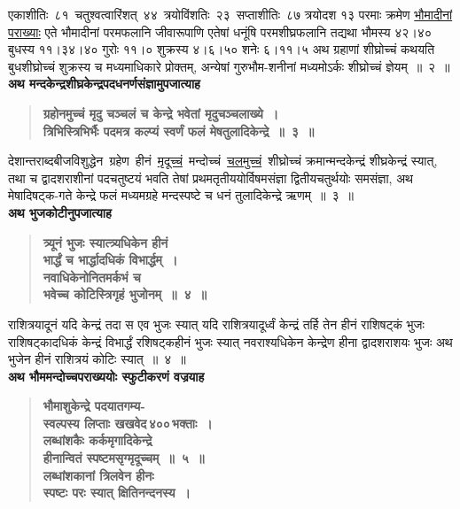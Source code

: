 \documentclass[11pt, openany]{book}
\begin{document}
एकाशीतिः \,८१ \,चतुश्वत्वारिंशत् \,४४ \,त्रयोविंशतिः \,२३ \,सप्ताशीतिः \,८७ त्रयोदश १३ परमाः क्रमेण \hyperref[2.2]{भौमादीनां पराख्याः} एते भौमादीनां परमफलानि जीवारूपाणि एतेषां धनूंषि परमशीघ्रफलानि तद्यथा भौमस्य ४२।४० बुधस्य ११।३४।४० गुरोः ११।० शुक्रस्य ४।६।५० शनेः ६।११।५ अथ ग्रहाणां शीघ्रोच्चं कथयति\textendash \,बुधशीघ्रोच्चं शुक्रस्य च मध्यमाधिकारे प्रोक्तम्, अन्येषां गुरुभौम-शनीनां मध्यमोऽर्कः शीघ्रोच्चं ज्ञेयम्~॥~२~॥\\

{\small \textbf{अथ मन्दकेन्द्रशीघ्रकेन्द्रपदधनर्णसंज्ञामुपजात्याह\textendash }}

 \label{2.3}
\begin{quote}
{\large \textbf{{\color{purple}ग्रहोनमुच्चं मृदु चञ्चलं च केन्द्रे भवेतां मृदुचञ्चलाख्ये~। \\
त्रिभिस्त्रिभिर्भैः पदमत्र कल्प्यं स्वर्णं फलं मेषतुलादिकेन्द्रे~॥~३~॥}}}
\end{quote}

\newpage

देशान्तराब्दबीजविशुद्धेन \,ग्रहेण \,हीनं \,\hyperref[2.3]{मृदूच्चं} \,मन्दोच्चं \,\hyperref[2.3]{चलमुच्चं} \,शीघ्रोच्चं क्रमान्मन्दकेन्द्रं शीघ्रकेन्द्रं स्यात्, तथा च द्वादशराशीनां पदचतुष्टयं भवति तेषां प्रथमतृतीययोर्विषमसंज्ञा द्वितीयचतुर्थयोः समसंज्ञा, अथ मेषादिषट्क-गते केन्द्रे फलं मध्यमग्रहे मन्दस्पष्टे च धनं तुलादिकेन्द्रे ऋणम्~॥~३~॥\\

{\small \textbf{अथ भुजकोटीनुपजात्याह\textendash }}

 \label{2.4}
\begin{quote}
{\large \textbf{{\color{purple}त्र्यूनं भुजः स्यात्त्र्यधिकेन हीनं \\
भार्द्धं च भार्द्धादधिकं विभार्द्धम्~। \\
नवाधिकेनोनितमर्कभं च \\
भवेच्च कोटिस्त्रिगृहं भुजोनम्~॥~४~॥}}}
\end{quote}

राशित्रयादूनं यदि केन्द्रं तदा स एव भुजः स्यात् यदि राशित्रयादूर्ध्वं केन्द्रं तर्हि तेन हीनं राशिषट्कं भुजः राशिषट्कादधिकं केन्द्रं विभार्द्धं रशिषट्कहीनं भुजः स्यात् नवराश्यधिकेन केन्द्रेण हीना द्वादशराशयः भुजः अथ भुजेन हीनं राशित्रयं कोटिः स्यात्~॥~४~॥\\

{\small \textbf{अथ भौममन्दोच्चपराख्ययोः स्फुटीकरणं वज्रयाह\textendash }}

 \label{2.5}
\begin{quote}
{\large \textbf{{\color{purple}भौमाशुकेन्द्रे पदयातगम्य-\\
स्वल्पस्य लिप्ताः खखवेद\textendash \,४००\textendash \,भक्ताः~।\\
लब्धांशकैः कर्कमृगादिकेन्द्रे \\
हीनान्वितं स्पष्टमसृग्मृदूच्चम्~॥~५~॥\\
लब्धांशकानां त्रिलवेन हीनः \\
स्पष्टः परः स्यात् क्षितिनन्दनस्य~। }}}
\end{quote}
\end{document}
